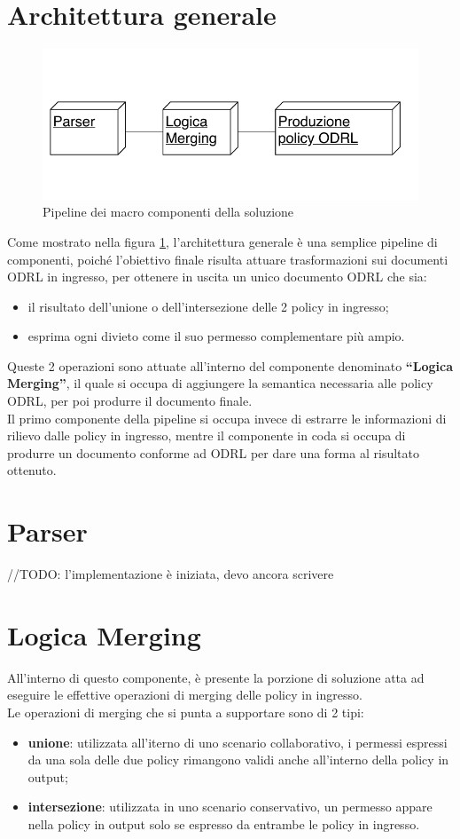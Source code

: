 \documentclass[12pt,a4paper,twoside]{book}
\begin{document}
\section{Architettura generale}
\begin{figure}[htp]
\centering
\includegraphics[scale=1]{../immagini/arch_gen.pdf}
\caption{Pipeline dei macro componenti della soluzione}
\label{archGenImpl}
\end{figure}
Come mostrato nella figura \ref{archGenImpl}, l'architettura generale è una semplice pipeline di componenti, poiché l'obiettivo finale risulta attuare trasformazioni sui documenti ODRL in ingresso, per ottenere in uscita un unico documento ODRL che sia:
\begin{itemize}
\item il risultato dell'unione o dell'intersezione delle 2 policy in ingresso;
\item esprima ogni divieto come il suo permesso complementare più ampio.
\end{itemize}
Queste 2 operazioni sono attuate all'interno del componente denominato \textbf{``Logica Merging''}, il quale si occupa di aggiungere la semantica necessaria alle policy ODRL, per poi produrre il documento finale.\\
Il primo componente della pipeline si occupa invece di estrarre le informazioni di rilievo dalle policy in ingresso, mentre il componente in coda si occupa di produrre un documento conforme ad ODRL per dare una forma al risultato ottenuto.
\section{Parser}\label{parsingSection}
//TODO: l'implementazione è iniziata, devo ancora scrivere
\section{Logica Merging}
All'interno di questo componente, è presente la porzione di soluzione atta ad eseguire le effettive operazioni di merging delle policy in ingresso.\\
Le operazioni di merging che si punta a supportare sono di 2 tipi:
\begin{itemize}
\item \textbf{unione}: utilizzata all'iterno di uno scenario collaborativo, i permessi espressi da una sola delle due policy rimangono validi anche all'interno della policy in output;
\item \textbf{intersezione}: utilizzata in uno scenario conservativo, un permesso appare nella policy in output solo se espresso da entrambe le policy in ingresso.
\end{itemize}
\end{document}

